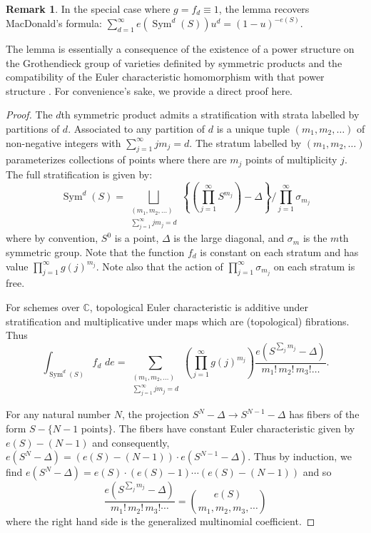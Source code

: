 \documentclass{amsart}
\theoremstyle{definition}
\newtheorem{remark}[theorem]{Remark}
\newcommand{\CC} {\mathbb{C}}          %
\newcommand{\Sym}{\operatorname{Sym}}
\begin{document}
\begin{remark} \label{MacD}
In the special case where $g=f_{d}\equiv  1$, the lemma recovers
MacDonald's formula: $\sum _{d=1}^{\infty }e (\Sym ^{d} (S)) u^{d} =
(1-u)^{-e (S)}$. 

The lemma is essentially a consequence of the existence of a power
structure on the Grothendieck group of varieties definited by
symmetric products and the compatibility of the Euler characteristic
homomorphism with that power structure \cite{}. For convenience's
sake, we provide a direct proof here.
\end{remark}
\begin{proof}
The $d$th symmetric product admits a stratification with strata
labelled by partitions of $d$. Associated to any partition of $d$ is a
unique tuple $(m_{1},m_{2},\dots )$ of non-negative integers with
$\sum _{j=1}^{\infty }j m_{j}=d$. The stratum labelled by
$(m_{1},m_{2},\dots )$ parameterizes collections of points where there
are $m_{j}$ points of multiplicity $j$. The full stratification is
given by:
\[
\Sym ^{d} (S) = \bigsqcup_{\begin{smallmatrix} (m_{1},m_{2},\dots )\\
\sum _{j=1}^{\infty }j m_{j}=d  \end{smallmatrix}} \left\{\left(\prod _{j=1}^{\infty }S^{m_{j}} \right) -\Delta  \right\}/ \prod _{j=1}^{\infty }\sigma _{m_{j}} 
\]
where by convention, $S^{0}$ is a point, $\Delta $ is the large
diagonal, and $\sigma _{m}$ is the $m$th symmetric group. Note that
the function $f_{d}$ is constant on each stratum and has value $\prod
_{j=1}^{\infty }g (j)^{m_{j}}$. Note also that the action of $\prod
_{j=1}^{\infty }\sigma _{m_{j}}$ on each stratum is free. 

For schemes over $\CC $, topological Euler characteristic is additive
under stratification and multiplicative under maps which are
(topological) fibrations. Thus
\[
\int _{\Sym ^{d} (S)} f_{d}\,\, de = \sum _{\begin{smallmatrix}(m_{1},m_{2},\dots )\\
\sum _{j=1}^{\infty }j m_{j}=d   \end{smallmatrix}} \left(\prod _{j=1}^{\infty } g (j)^{m_{j}} \right) \frac{e (S^{\sum _{j}m_{j}}-\Delta )}{m_{1}!\, m_{2}!\, m_{3}!\dots }.
\]

For any natural number $N$, the projection $S^{N}-\Delta \to
S^{N-1}-\Delta $ has fibers of the form $S-\{N-1\text{ points}
\}$. The fibers have constant Euler characteristic given by $e (S)-
(N-1)$ and consequently, $e (S^{N}-\Delta )= (e (S)- (N-1))\cdot e
(S^{N-1}-\Delta )$. Thus by induction, we find $e (S^{N}-\Delta ) = e
(S)\cdot (e (S)-1)\cdots (e (S)- (N-1))$ and so 
\[
\frac{e (S^{\sum _{j}m_{j}}-\Delta )}{m_{1}!\,m_{2}!\,m_{3}!\cdots } = \binom{e (S)}{m_{1},m_{2},m_{3},\cdots }
\]
where the right hand side is the generalized multinomial coefficient.


\end{proof}
\end{document}
